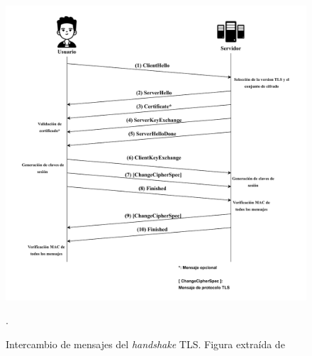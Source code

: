 \begin{figure}
    \centering
    \includegraphics[width= \textwidth]{Imagenes/Seguridad de las comunicaciones/handshakeTLS.pdf}
    \caption{Intercambio de mensajes del \textit{handshake} TLS. Figura extraída de} \cite{ristic2014bulletproof}.
    \label{fig:handshakeTLS}
\end{figure}
